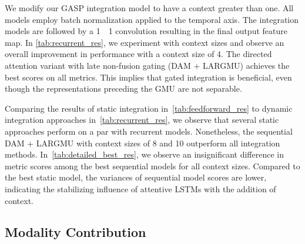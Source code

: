 \documentclass{article}
\begin{document}
We modify our GASP integration model to have a context greater than one. 
All models employ batch normalization applied to the temporal axis. The integration models are followed by a 1~~1 convolution resulting in the final output feature map. In \autoref{tab:recurrent_res}, we experiment with context sizes  and observe an overall improvement in performance with a context size of 4. The directed attention variant with late non-fusion gating (DAM + LARGMU) achieves the best scores on all metrics. This implies that gated integration is beneficial, even though the representations preceding the GMU are not separable. 

Comparing the results of static integration in~\autoref{tab:feedforward_res} to dynamic integration approaches in~\autoref{tab:recurrent_res}, we observe that several static approaches perform on a par with recurrent models. Nonetheless, the sequential DAM + LARGMU with context sizes of 8 and 10 outperform all integration methods. In~\autoref{tab:detailed_best_res}, we observe an insignificant difference in metric scores among the best sequential models for all context sizes. Compared to the best static model, the variances of sequential model scores are lower, indicating the stabilizing influence of attentive LSTMs with the addition of context.

\subsection{Modality Contribution}

\begin{table}[H]
\centering
\caption{Social cue modality ablation applied to our best GASP model (DAM + LARGMU; Context Size = 10).}
\label{tab:ablation_res}
 \end{table}
 
\end{document}
